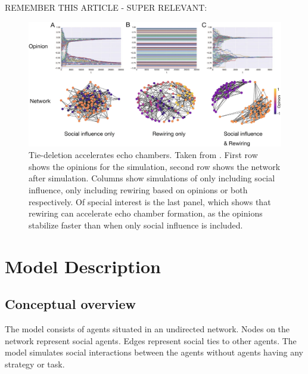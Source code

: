 \documentclass{article}
\begin{document}
REMEMBER THIS ARTICLE - SUPER RELEVANT: \cite{geschke2019triple}

\begin{figure}[H]
    \centering
    \includegraphics[width=.8\linewidth]{../plots/references/echo_chambers.png}
  \caption{Tie-deletion accelerates echo chambers. Taken from \protect\citeauthor{sasahara_social_2021} \protect\citeyear{sasahara_social_2021}. First row shows the opinions for the simulation, second row shows the network after simulation. Columns show simulations of only including social influence, only including rewiring based on opinions or both respectively. Of special interest is the last panel, which shows that rewiring can accelerate echo chamber formation, as the opinions stabilize faster than when only social influence is included.}
  \label{fig:echo_chambers}
\end{figure}

\section{Model Description}
\subsection{Conceptual overview}
The model consists of agents situated in an undirected network. Nodes on the network represent social agents. Edges represent social ties to other agents. 
The model simulates social interactions between the agents without agents having any strategy or task. 
\end{document}
